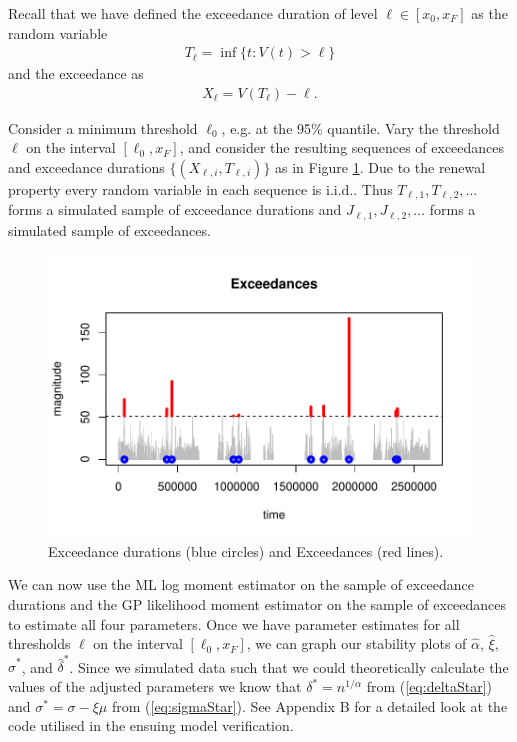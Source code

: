 \documentclass[honours,12pt,twoside, openright]{unswthesis}
\newcommand{\1}{\mathbf 1}
\numberwithin{equation}{section}
\theoremstyle{definition}
\theoremstyle{remark}
\begin{document}
Recall that we have defined the exceedance duration of level $\ell \in [x_0,x_F]$ as
the random variable
\begin{align*}
T_\ell = \inf\{t: V(t) > \ell\}
\end{align*}
and the exceedance as 
\begin{align*}
X_\ell = V(T_\ell) - \ell.
\end{align*}

Consider a minimum threshold $\ell_0$, e.g. at the 95\% quantile.
Vary the threshold $\ell$ on the interval $[\ell_0, x_F]$, and consider
the resulting sequences of exceedances and exceedance durations 
$\{(X_{\ell,i}, T_{\ell,i})\}$ as in Figure \ref{fig:thresholdedBursty}. 
Due to the renewal property every random variable in each sequence is i.i.d.. Thus $T_{\ell,1}, T_{\ell,2}, \ldots$ forms a simulated sample of exceedance durations and $J_{\ell,1}, J_{\ell,2}, \ldots$ forms a simulated sample of exceedances.


\begin{figure}[h]
    \centering
    \includegraphics[width=\textwidth]{Figures/Exceedances.pdf}
    \caption{Exceedance durations (blue circles) and Exceedances (red lines).}\label{fig:thresholdedBursty}
\end{figure}

We can now use the ML log moment estimator on the sample of exceedance durations and the GP likelihood moment estimator on the sample of exceedances to estimate all four parameters. Once we have parameter estimates for all thresholds $\ell$ on the interval $[\ell_0, x_F]$, we can graph our stability plots of $\hat \alpha$, $\hat\xi,$ $\hat\sigma^{*}$, and $\hat\delta^{*}$. Since we simulated data such that we could theoretically calculate the values of the adjusted parameters we know that $\delta^{*}=n^{1/\alpha}$ from (\ref{eq:deltaStar}) and $\sigma^{*}=\sigma-\xi\mu$ from (\ref{eq:sigmaStar}). See Appendix B for a detailed look at the code utilised in the ensuing model verification.
\end{document}
